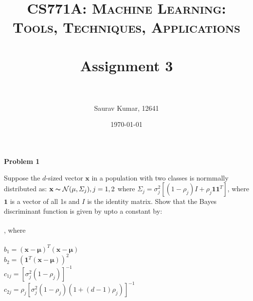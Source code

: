 \documentclass[12pt]{article}
\title{	
\normalfont \normalsize 
\textsc{CS771A: Machine Learning: Tools, Techniques, Applications} \\ [25pt] 
\horrule{0.5pt} \\[0.4cm] 
\huge Assignment 3 \\
\horrule{2pt} \\[0.5cm] 
}
\author{Saurav Kumar, 12641}
\date{\normalsize\today}
\numberwithin{equation}{section}
\numberwithin{figure}{section}
\numberwithin{table}{section}
\renewcommand{\vec}[1]{\mathbf{#1}}
\begin{document}
\maketitle 

{\bf Problem 1}
\bigskip

Suppose the $d$-sized vector $\vec{x}$ in a population with two classes is normmally distributed as: $\vec{x} \thicksim \mathcal{N}(\vec{\mu},\varSigma_{j}), j = 1,2 $ where $\varSigma_{j} = \sigma^{2}_{j}[(1 - \rho_{j})I + \rho_{j}\vec{1}\vec{1}^{T}]$, where $\vec{1}$ is a vector of all 1s and $I$ is the identity matrix. Show that the Bayes discriminant function is given by upto a constant by:\\\\
, where\\\\
$b_{1} = (\vec{x}-\vec{\mu})^{T}(\vec{x}-\vec{\mu})$\\
$b_{2} = (\vec{1}^{T}(\vec{x}-\vec{\mu}))^{2}$\\
$c_{1j} = [\sigma_{j}^{2}(1-\rho_{j})]^{-1} $ \\
$c_{2j} = \rho_{j}[\sigma_{j}^{2}(1-\rho_{j})(1 + (d-1)\rho_{j})]^{-1} $\\
\end{document}

